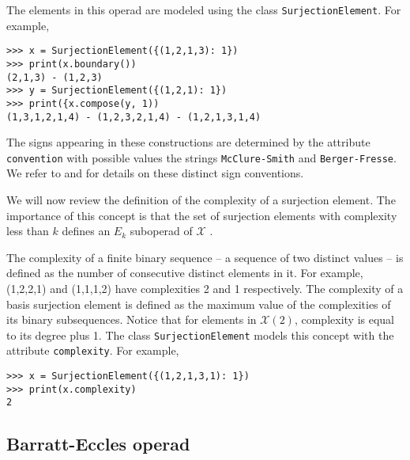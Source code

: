 \documentclass{amsart}
\begin{document}
The elements in this operad are modeled using the class \texttt{SurjectionElement}.
For example,

\begin{Verbatim}[frame=lines, samepage=true]
>>> x = SurjectionElement({(1,2,1,3): 1})
>>> print(x.boundary())
(2,1,3) - (1,2,3)
>>> y = SurjectionElement({(1,2,1): 1})
>>> print({x.compose(y, 1))
(1,3,1,2,1,4) - (1,2,3,2,1,4) - (1,2,1,3,1,4)
\end{Verbatim}

The signs appearing in these constructions are determined by the attribute \texttt{convention} with possible values the strings \texttt{McClure-Smith} and \texttt{Berger-Fresse}.
We refer to \cite{McClureSmith03} and \cite{BergerFresse04} for details on these distinct sign conventions.

We will now review the definition of the complexity of a surjection element.
The importance of this concept is that the set of surjection elements with complexity less than $k$ defines an $E_k$ suboperad of $\mathcal X$ \cite{McClureSmith03}.

The complexity of a finite binary sequence -- a sequence of two distinct values -- is defined as the number of consecutive distinct elements in it.
For example, (1,2,2,1) and (1,1,1,2) have complexities 2 and 1 respectively.
The complexity of a basis surjection element is defined as the maximum value of the complexities of its binary subsequences.
Notice that for elements in $\mathcal X(2)$, complexity is equal to its degree plus 1.
The class \texttt{SurjectionElement} models this concept with the attribute \texttt{complexity}.
For example,

\begin{Verbatim}[frame=lines, samepage=true]
>>> x = SurjectionElement({(1,2,1,3,1): 1})
>>> print(x.complexity)
2
\end{Verbatim}

\subsection{Barratt-Eccles operad}
\end{document}
